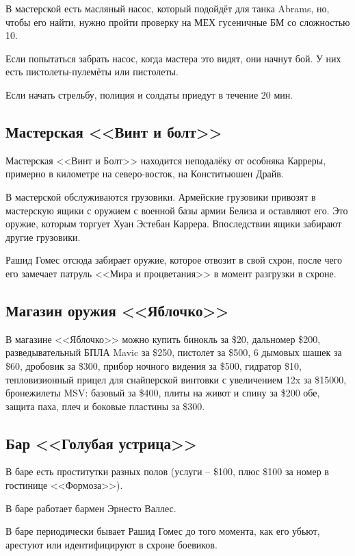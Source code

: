 \documentclass{article}
\begin{document}
В мастерской есть масляный насос, который подойдёт для танка Abrams, но,
чтобы его найти, нужно пройти проверку на МЕХ гусеничные БМ со
сложностью 10.

Если попытаться забрать насос, когда мастера это видят, они начнут бой.
У них есть пистолеты-пулемёты или пистолеты.

Если начать стрельбу, полиция и солдаты приедут в течение 20 мин.

\subsection{Мастерская <<Винт и
болт>>}\label{screw-bolt-shop}

Мастерская <<Винт и Болт>> находится неподалёку от особняка Карреры,
примерно в километре на северо-восток, на Конститьюшен Драйв.

В мастерской обслуживаются грузовики. Армейские грузовики привозят в
мастерскую ящики с оружием с военной базы армии Белиза и оставляют его.
Это оружие, которым торгует Хуан Эстебан Каррера. Впоследствии ящики
забирают другие грузовики.

Рашид Гомес отсюда забирает оружие, которое отвозит в свой схрон, после
чего его замечает патруль <<Мира и процветания>> в момент разгрузки в
схроне.

\subsection{Магазин оружия
<<Яблочко>>}\label{weapon-shop-yablochko}

В магазине <<Яблочко>> можно купить бинокль за \$20, дальномер \$200,
разведывательный БПЛА Mavic за \$250, пистолет за \$500, 6 дымовых шашек
за \$60, дробовик за \$300, прибор ночного видения за \$500, гидратор
\$10, тепловизионный прицел для снайперской винтовки с увеличением 12x
за \$15000, бронежилеты MSV: базовый за \$400, плиты на живот и спину за
\$200 обе, защита паха, плеч и боковые пластины за \$300.

\subsection{Бар <<Голубая
устрица>>}\label{blue-oyster-bar}

В баре есть проститутки разных полов (услуги -- \$100, плюс \$100 за
номер в гостинице <<Формоза>>).

В баре работает бармен Эрнесто Валлес.

В баре периодически бывает Рашид Гомес до того момента, как его убьют,
арестуют или идентифицируют в схроне боевиков.
\end{document}
